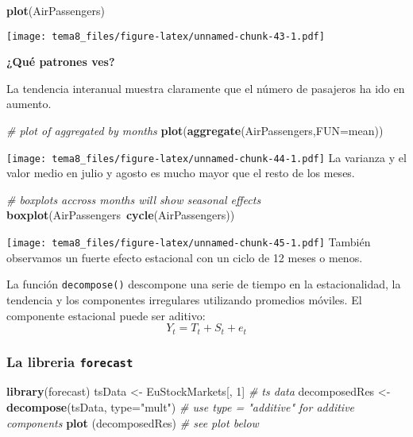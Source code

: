 \documentclass[]{article}
\newenvironment{Shaded}{\begin{snugshade}}{\end{snugshade}}
\newcommand{\KeywordTok}[1]{\textcolor[rgb]{0.13,0.29,0.53}{\textbf{{#1}}}}
\newcommand{\DataTypeTok}[1]{\textcolor[rgb]{0.13,0.29,0.53}{{#1}}}
\newcommand{\DecValTok}[1]{\textcolor[rgb]{0.00,0.00,0.81}{{#1}}}
\newcommand{\StringTok}[1]{\textcolor[rgb]{0.31,0.60,0.02}{{#1}}}
\newcommand{\CommentTok}[1]{\textcolor[rgb]{0.56,0.35,0.01}{\textit{{#1}}}}
\newcommand{\NormalTok}[1]{{#1}}
\numberwithin{equation}{section}
\begin{document}
\begin{Shaded}
\begin{Highlighting}[]
\KeywordTok{plot}\NormalTok{(AirPassengers)}
\end{Highlighting}
\end{Shaded}

\texttt{[image: tema8\_files/figure-latex/unnamed-chunk-43-1.pdf]}

\textbf{¿Qué patrones ves?}

La tendencia interanual muestra claramente que el número de pasajeros ha
ido en aumento.

\begin{Shaded}
\begin{Highlighting}[]
\CommentTok{# plot of aggregated by months}
\KeywordTok{plot}\NormalTok{(}\KeywordTok{aggregate}\NormalTok{(AirPassengers,}\DataTypeTok{FUN=}\NormalTok{mean))}
\end{Highlighting}
\end{Shaded}

\texttt{[image: tema8\_files/figure-latex/unnamed-chunk-44-1.pdf]} La
varianza y el valor medio en julio y agosto es mucho mayor que el resto
de los meses.

\begin{Shaded}
\begin{Highlighting}[]
\CommentTok{# boxplots accross months will show seasonal effects}
\KeywordTok{boxplot}\NormalTok{(AirPassengers~}\KeywordTok{cycle}\NormalTok{(AirPassengers))}
\end{Highlighting}
\end{Shaded}

\texttt{[image: tema8\_files/figure-latex/unnamed-chunk-45-1.pdf]}
También observamos un fuerte efecto estacional con un ciclo de 12 meses
o menos.

La función \texttt{decompose()} descompone una serie de tiempo en la
estacionalidad, la tendencia y los componentes irregulares utilizando
promedios móviles. El componente estacional puede ser aditivo: \[
      Y_t = T_t + S_t + e_t
\]

\subsubsection{\texorpdfstring{La libreria
\texttt{forecast}}{La libreria forecast}}\label{la-libreria-forecast}

\begin{Shaded}
\begin{Highlighting}[]
\KeywordTok{library}\NormalTok{(forecast)}
\NormalTok{tsData <-}\StringTok{ }\NormalTok{EuStockMarkets[, }\DecValTok{1}\NormalTok{] }\CommentTok{# ts data}
\NormalTok{decomposedRes <-}\StringTok{ }\KeywordTok{decompose}\NormalTok{(tsData,}
                           \DataTypeTok{type=}\StringTok{"mult"}\NormalTok{)}
                \CommentTok{# use type = "additive" for additive components}
\KeywordTok{plot} \NormalTok{(decomposedRes) }\CommentTok{# see plot below}
\end{Highlighting}
\end{Shaded}
\end{document}
